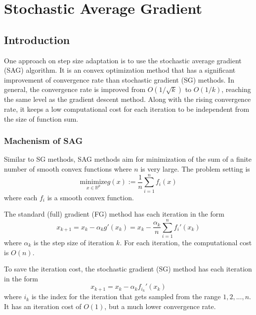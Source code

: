 \chapter{Stochastic Average Gradient}
\label{ch: SAG}

\section{Introduction}
One approach on step size adaptation is to use the stochastic average gradient (SAG)\cite{schmidtMinimizingFiniteSums2016} algorithm. It is an convex optimization method that has a significant improvement of convergence rate than stochastic gradient (SG) methods. In general, the convergence rate is improved from $O(1/\sqrt{k})$ to $O(1/k)$, reaching the same level as the gradient descent method. Along with the rising convergence rate, it keeps a low computational cost for each iteration to be independent from the size of function sum.

\subsection{Machenism of SAG}
Similar to SG methods, SAG methods aim for minimization of the sum of a finite number of smooth convex functions where $n$ is very large. The problem setting is
\begin{equation}
\underset{x \in \mathbb{R}^p}{\text{minimize}} g(x) := \frac{1}{n}\sum^n_{i=1} f_i(x)
\end{equation}
where each $f_i$ is a smooth convex function.

The standard (full) gradient (FG) method has each iteration in the form
\begin{equation}
x_{k+1} = x_k - \alpha_k g\prime (x_k) = x_k - \frac{\alpha_k}{n}\sum^n_{i=1} f_i\prime(x_k)
\end{equation}
where $\alpha_k$ is the step size of iteration $k$. For each iteration, the computational cost is $O(n)$.

To save the iteration cost, the stochastic gradient (SG) method has each iteration in the form
\begin{equation}
x_{k+1} = x_k - \alpha_k f_{i_k}\prime (x_k)
\end{equation}
where $i_k$ is the index for the iteration that gets sampled from the range {$1, 2,...,n$}. It has an iteration cost of $O(1)$, but a much lower convergence rate.

